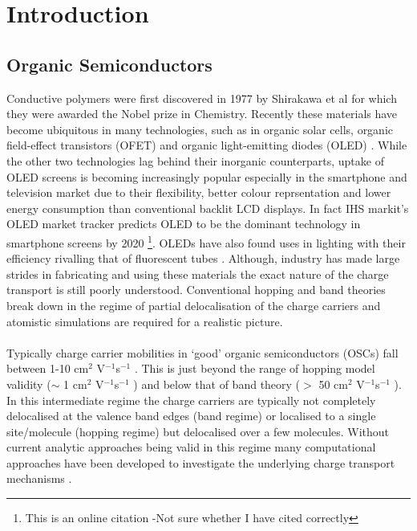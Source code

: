 \chapter{Introduction}
\label{chapterlabel1}
\section{Organic Semiconductors}
Conductive polymers were first discovered in 1977 by Shirakawa et al  \cite{chiang_electrical_1977, Shirakawa1977Jan} for which they were awarded the Nobel prize in Chemistry. Recently these materials have become ubiquitous in many technologies, such as in organic solar cells\cite{Kippelen2009}, organic field-effect transistors (OFET) \cite{Malachowski2010Jun} and organic light-emitting diodes (OLED) \cite{ThejoKalyani2012Jun}. While the other two technologies lag behind their inorganic counterparts, uptake of OLED screens is becoming increasingly popular especially in the smartphone and television market due to their flexibility, better colour reprsentation and lower energy consumption than conventional backlit LCD displays. In fact IHS markit's OLED market tracker predicts OLED to be the dominant technology in smartphone screens by 2020 \cite{IHSMarkit} \footnote{This is an online citation -Not sure whether I have cited correctly}. OLEDs have also found uses in lighting with their efficiency rivalling that of fluorescent tubes \cite{Reineke2009May, OLED_lighting}. Although, industry has made large strides in fabricating and using these materials the exact nature of the charge transport is still poorly understood. Conventional hopping and band theories break down in the regime of partial delocalisation of the charge carriers and atomistic simulations are required for a realistic picture.
\\\\
Typically charge carrier mobilities in `good' organic semiconductors (OSCs) fall between 1-10 cm$^2$ V$^{-1}$s$^{-1}$ \cite{yavuz_dichotomy_2017}. This is just beyond the range of hopping model validity ($\sim $ 1 cm$^2$ V$^{-1}$s$^{-1}$ ) and below that of band theory ($>$ 50 cm$^2$ V$^{-1}$s$^{-1}$ ). In this intermediate regime the charge carriers are typically not completely delocalised at the valence band edges (band regime) or localised to a single site/molecule (hopping regime) but delocalised over a few molecules. Without current analytic approaches being valid in this regime many computational approaches have been developed to investigate the underlying charge transport mechanisms \cite{oberhofer_charge_2017}.
